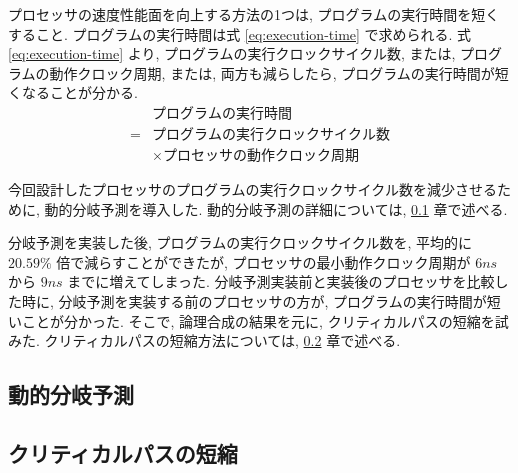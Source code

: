\documentclass[../main.tex]{subfiles}
\begin{document}
  プロセッサの速度性能面を向上する方法の1つは, プログラムの実行時間を短くすること.
  プログラムの実行時間は式 \ref{eq:execution-time} で求められる.
  式 \ref{eq:execution-time} より, プログラムの実行クロックサイクル数, 
  または, プログラムの動作クロック周期, 
  または, 両方も減らしたら, プログラムの実行時間が短くなることが分かる.
  \begin{equation}
    \begin{aligned}
      &プログラムの実行時間 \\
      = &プログラムの実行クロックサイクル数 \\
      &\times プロセッサの動作クロック周期
      \label{eq:execution-time}
    \end{aligned}
  \end{equation}

  今回設計したプロセッサのプログラムの実行クロックサイクル数を減少させるために, 動的分岐予測を導入した.
  動的分岐予測の詳細については, \ref{subsection:jump-prediction} 章で述べる.

  分岐予測を実装した後, プログラムの実行クロックサイクル数を, 
  平均的に $20.59\%$ 倍で減らすことができたが, 
  プロセッサの最小動作クロック周期が $6ns$ から $9ns$ までに増えてしまった.
  分岐予測実装前と実装後のプロセッサを比較した時に, 
  分岐予測を実装する前のプロセッサの方が, 
  プログラムの実行時間が短いことが分かった.
  そこで, 論理合成の結果を元に, クリティカルパスの短縮を試みた.
  クリティカルパスの短縮方法については, \ref{subsection:critical-path} 章で述べる.

  \subsection{動的分岐予測} \label{subsection:jump-prediction}
  

  \subsection{クリティカルパスの短縮} \label{subsection:critical-path}
  
\end{document}
